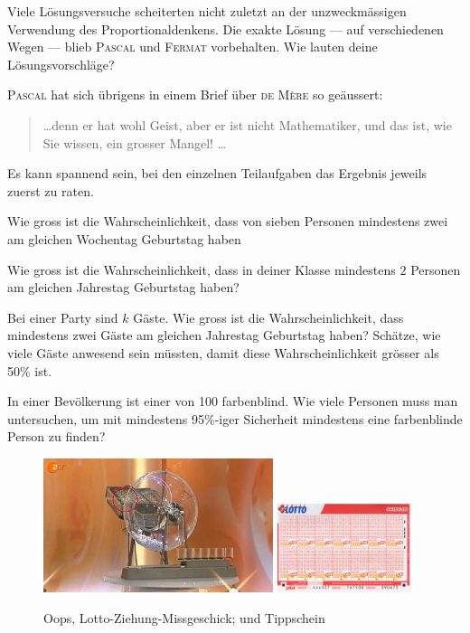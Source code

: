 \documentclass[%
11pt,%
twoside,%
titlepage,%
german,%
headsepline%
]{scrartcl}
\begin{document}
Viele Lösungsversuche scheiterten nicht zuletzt an der unzweckmässigen Verwendung des Proportionaldenkens. Die exakte Lösung --- auf verschiedenen Wegen --- blieb \textsc{Pascal} und \textsc{Fermat} vorbehalten. Wie lauten deine Lösungsvorschläge?

\textsc{Pascal} hat sich übrigens in einem Brief über \textsc{de Mère} so geäussert:
\begin{quote}
\dots denn er hat wohl Geist, aber er ist nicht Mathematiker, und das ist, wie Sie wissen, ein grosser Mangel! \dots
\end{quote}

\begin{ueb}[Geburtstagsparadoxon]
Es
kann spannend sein, bei den einzelnen Teilaufgaben das Ergebnis jeweils zuerst zu raten.
\begin{enumeratea}
\item Wie gross ist die Wahrscheinlichkeit, dass von sieben Personen mindestens zwei am gleichen Wochentag Geburtstag haben
\item Wie gross ist die Wahrscheinlichkeit, dass in deiner Klasse mindestens $2$ Personen am gleichen Jahrestag Geburtstag haben?
\item Bei einer Party sind $k$ Gäste. Wie gross ist die Wahrscheinlichkeit, dass mindestens zwei Gäste am gleichen Jahrestag Geburtstag haben? Schätze, wie viele Gäste anwesend sein müssten, damit diese Wahrscheinlichkeit grösser als 50\% ist.
\end{enumeratea}
\end{ueb}

\begin{ueb}[farbenblind]
In einer Bevölkerung ist einer von 100 farbenblind. Wie viele Personen muss man untersuchen, um mit mindestens 95\%-iger Sicherheit mindestens eine farbenblinde Person zu finden?
\end{ueb}

\begin{figure}
  \begin{center}
    \includegraphics[width=0.6\textwidth]{pictures/lotto}
    \includegraphics[width=0.35\textwidth]{pictures/CHLotto}
  \end{center}
\caption{Oops, Lotto-Ziehung-Missgeschick; und Tippschein}
\end{figure}
\end{document}
